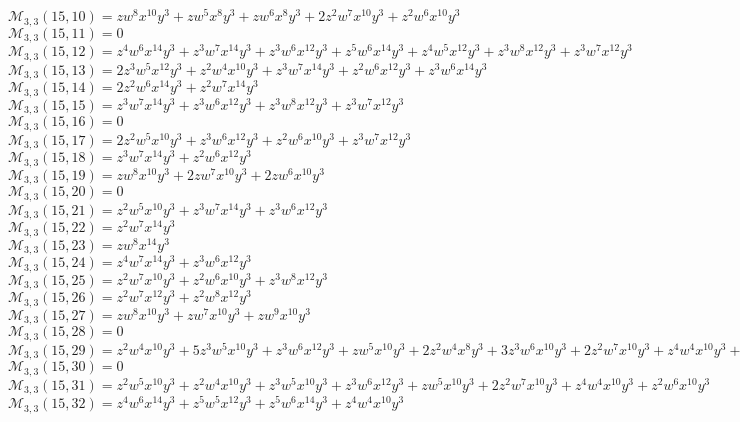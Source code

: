 $\mathcal{M}_{3,3}(15,10)=zw^8x^{10}y^3+zw^5x^8y^3+zw^6x^8y^3+2z^2w^7x^{10}y^3+z^2w^6x^{10}y^3$\\
$\mathcal{M}_{3,3}(15,11)=0$\\
$\mathcal{M}_{3,3}(15,12)=z^4w^6x^{14}y^3+z^3w^7x^{14}y^3+z^3w^6x^{12}y^3+z^5w^6x^{14}y^3+z^4w^5x^{12}y^3+z^3w^8x^{12}y^3+z^3w^7x^{12}y^3$\\
$\mathcal{M}_{3,3}(15,13)=2z^3w^5x^{12}y^3+z^2w^4x^{10}y^3+z^3w^7x^{14}y^3+z^2w^6x^{12}y^3+z^3w^6x^{14}y^3$\\
$\mathcal{M}_{3,3}(15,14)=2z^2w^6x^{14}y^3+z^2w^7x^{14}y^3$\\
$\mathcal{M}_{3,3}(15,15)=z^3w^7x^{14}y^3+z^3w^6x^{12}y^3+z^3w^8x^{12}y^3+z^3w^7x^{12}y^3$\\
$\mathcal{M}_{3,3}(15,16)=0$\\
$\mathcal{M}_{3,3}(15,17)=2z^2w^5x^{10}y^3+z^3w^6x^{12}y^3+z^2w^6x^{10}y^3+z^3w^7x^{12}y^3$\\
$\mathcal{M}_{3,3}(15,18)=z^3w^7x^{14}y^3+z^2w^6x^{12}y^3$\\
$\mathcal{M}_{3,3}(15,19)=zw^8x^{10}y^3+2zw^7x^{10}y^3+2zw^6x^{10}y^3$\\
$\mathcal{M}_{3,3}(15,20)=0$\\
$\mathcal{M}_{3,3}(15,21)=z^2w^5x^{10}y^3+z^3w^7x^{14}y^3+z^3w^6x^{12}y^3$\\
$\mathcal{M}_{3,3}(15,22)=z^2w^7x^{14}y^3$\\
$\mathcal{M}_{3,3}(15,23)=zw^8x^{14}y^3$\\
$\mathcal{M}_{3,3}(15,24)=z^4w^7x^{14}y^3+z^3w^6x^{12}y^3$\\
$\mathcal{M}_{3,3}(15,25)=z^2w^7x^{10}y^3+z^2w^6x^{10}y^3+z^3w^8x^{12}y^3$\\
$\mathcal{M}_{3,3}(15,26)=z^2w^7x^{12}y^3+z^2w^8x^{12}y^3$\\
$\mathcal{M}_{3,3}(15,27)=zw^8x^{10}y^3+zw^7x^{10}y^3+zw^9x^{10}y^3$\\
$\mathcal{M}_{3,3}(15,28)=0$\\
$\mathcal{M}_{3,3}(15,29)=z^2w^4x^{10}y^3+5z^3w^5x^{10}y^3+z^3w^6x^{12}y^3+zw^5x^{10}y^3+2z^2w^4x^8y^3+3z^3w^6x^{10}y^3+2z^2w^7x^{10}y^3+z^4w^4x^{10}y^3+z^2w^5x^8y^3$\\
$\mathcal{M}_{3,3}(15,30)=0$\\
$\mathcal{M}_{3,3}(15,31)=z^2w^5x^{10}y^3+z^2w^4x^{10}y^3+z^3w^5x^{10}y^3+z^3w^6x^{12}y^3+zw^5x^{10}y^3+2z^2w^7x^{10}y^3+z^4w^4x^{10}y^3+z^2w^6x^{10}y^3$\\
$\mathcal{M}_{3,3}(15,32)=z^4w^6x^{14}y^3+z^5w^5x^{12}y^3+z^5w^6x^{14}y^3+z^4w^4x^{10}y^3$\\
